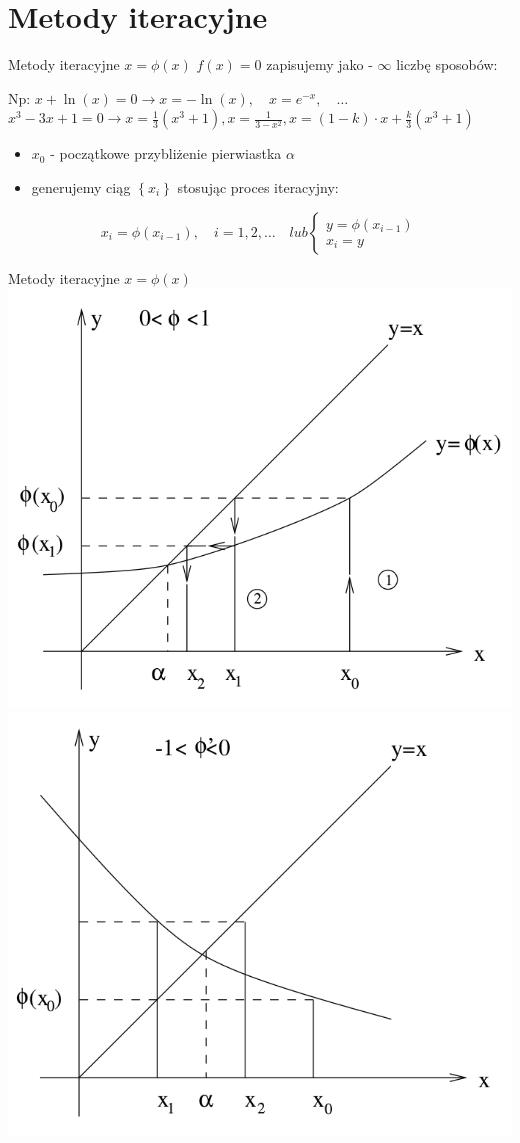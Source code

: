 \section{Metody iteracyjne}
\begin{frame}{Metody iteracyjne $x = \phi(x)$}
	$f(x) = 0$ zapisujemy jako  - $\infty$ liczbę sposobów:\linebreak
	
	Np:\linebreak
	$x + \ln(x) = 0 \rightarrow x = -\ln(x),\quad x = e^{-x},\quad \ldots$
	$x^{3} - 3x + 1 = 0 \rightarrow x = \frac{1}{3}(x^{3} + 1), x = \frac{1}{3 - x^{2}}, x = (1 - k) \cdot x + \frac{k}{3}(x^{3} + 1)$
	
	\begin{itemize}
		\item $x_{0}$ - początkowe przybliżenie pierwiastka $\alpha$
		\item generujemy ciąg $\left\{x_{i}\right\}$ stosując proces iteracyjny:
	\end{itemize}
	\[
		x_{i} = \phi(x_{i-1}),\quad i = 1, 2, \ldots \quad lub
		\begin{cases}
			y = \phi(x_{i-1})\\
			x_{i} = y
		\end{cases}
	\]
\end{frame}
\begin{frame}{Metody iteracyjne $x = \phi(x)$}
	\includegraphics[width=.5\linewidth]{img/7/7_3_1}
	\includegraphics[width=.5\linewidth]{img/7/7_3_2}
\end{frame}
